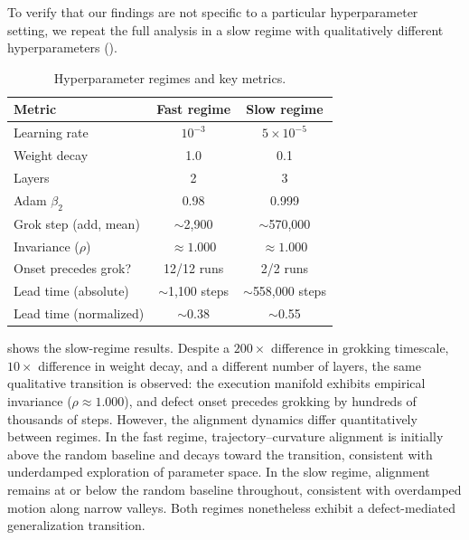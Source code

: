 \documentclass[11pt]{article}
\begin{document}
To verify that our findings are not specific to a particular hyperparameter setting, we repeat the full analysis in a slow regime with qualitatively different hyperparameters ().

\begin{table}[ht]
\centering
\caption{Hyperparameter regimes and key metrics.}
\label{tab:regimes}
\begin{tabular}{@{}lcc@{}}
\toprule
Metric & Fast regime & Slow regime \\
\midrule
Learning rate & $10^{-3}$ & $5 \times 10^{-5}$ \\
Weight decay & 1.0 & 0.1 \\
Layers & 2 & 3 \\
Adam $\beta_2$ & 0.98 & 0.999 \\
\midrule
Grok step (add, mean) & $\sim$2,900 & $\sim$570,000 \\
Invariance ($\rho$) & $\approx 1.000$ & $\approx 1.000$ \\
Onset precedes grok? & 12/12 runs & 2/2 runs \\
Lead time (absolute) & $\sim$1,100 steps & $\sim$558,000 steps \\
Lead time (normalized) & $\sim$0.38 & $\sim$0.55 \\
\bottomrule
\end{tabular}
\end{table}

 shows the slow-regime results.
Despite a $200\times$ difference in grokking timescale, $10\times$ difference in weight decay, and a different number of layers, the same qualitative transition is observed: the execution manifold exhibits empirical invariance ($\rho \approx 1.000$), and defect onset precedes grokking by hundreds of thousands of steps.
However, the alignment dynamics differ quantitatively between regimes.
In the fast regime, trajectory--curvature alignment is initially above the random baseline and decays toward the transition, consistent with underdamped exploration of parameter space.
In the slow regime, alignment remains at or below the random baseline throughout, consistent with overdamped motion along narrow valleys.
Both regimes nonetheless exhibit a defect-mediated generalization transition.
\end{document}
